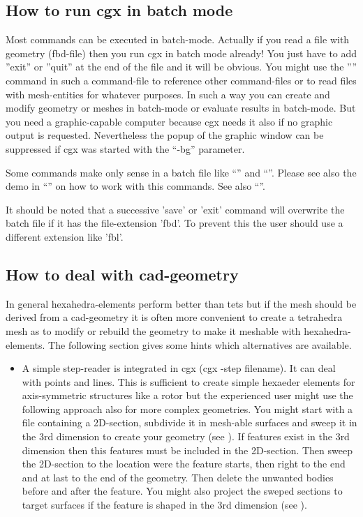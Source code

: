 \documentclass{article}
\begin{document}
\begin{appendix}
\subsection{\label{How to run cgx in batch mode}How to run cgx in batch mode}
Most commands can be executed in batch-mode. Actually if you read a file with geometry (fbd-file) then you run cgx in batch mode already! You just have to add ''exit'' or ''quit'' at the end of the file and it will be obvious. You might use the '''' command in such a command-file to reference other command-files or to read files with mesh-entities for whatever purposes. In such a way you can create and modify geometry or meshes in batch-mode or evaluate results in batch-mode. But you need a graphic-capable computer because cgx needs it also if no graphic output is requested. Nevertheless the popup of the graphic window can be suppressed if cgx was started with the ``-bg'' parameter.

Some commands make only sense in a batch file like ``'' and ``''. Please see also the demo in ``'' on how to work with this commands. See also ``''.

It should be noted that a successive 'save' or 'exit' command will overwrite the batch file if it has the file-extension 'fbd'. To prevent this the user should use a different extension like 'fbl'.

\subsection{\label{How to deal with cad-geometry}How to deal with cad-geometry}
In general hexahedra-elements perform better than tets but if the mesh should be derived from a cad-geometry it is often more convenient to create a tetrahedra mesh as to modify or rebuild the geometry to make it meshable with hexahedra-elements. The following section gives some hints which alternatives are available.

\begin{itemize}
\item A simple step-reader is integrated in cgx (cgx -step filename). It can deal with points and lines. This is sufficient to create simple hexaeder elements for axis-symmetric structures like a rotor but the experienced user might use the following approach also for more complex geometries. You might start with a file containing a 2D-section, subdivide it in mesh-able surfaces and sweep it in the 3rd dimension to create your geometry (see ). If features exist in the 3rd dimension then this features must be included in the 2D-section. Then sweep the 2D-section to the location were the feature starts, then right to the end and at last to the end of the geometry. Then delete the unwanted bodies before and after the feature. You might also project the sweped sections to target surfaces if the feature is shaped in the 3rd dimension (see ).


\end{itemize}
\end{appendix}
\end{document}
